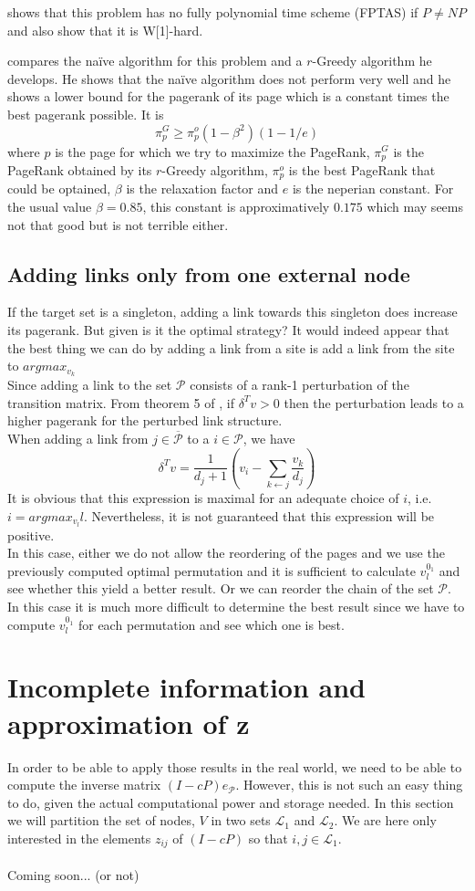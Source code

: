\documentclass{article}
\newcommand{\1}{\mathbf{1}}
\theoremstyle{definition}
\begin{document}
\cite{olsen2010maximizing} shows that this problem has no fully polynomial time scheme (FPTAS) if $P \neq NP$ and also show that it is W[1]-hard.

\cite{olsen2010constant} compares the naïve algorithm for this problem and a $r$-Greedy algorithm he develops.
He shows that the naïve algorithm does not perform very well and he shows a lower bound for the pagerank of its page which is a constant times the best pagerank possible. It is
\[ \pi_p^G \geq \pi_p^o(1 - \beta^2)(1 - 1/e) \]
where $p$ is the page for which we try to maximize the PageRank,
$\pi_p^G$ is the PageRank obtained by its $r$-Greedy algorithm, $\pi_p^o$ is the best PageRank that could be optained, $\beta$ is the relaxation factor and $e$ is the neperian constant.
For the usual value $\beta = 0.85$, this constant is approximatively $0.175$ which may seems not that good but is not terrible either.\\
\subsection{Adding links only from one external node}
If the target set is a singleton, adding a link towards this singleton does increase its pagerank. But given is it the optimal strategy? It would indeed appear that the best thing we can do by adding a link from a site is add a link from the site to $argmax_{v_k}$\\ 
Since adding a link to the set $\mathcal{P}$ consists of a rank-1 perturbation of the transition matrix. From theorem 5 of \cite{de2008maximizing}, if $\delta^Tv>0$ then the perturbation leads to a higher pagerank for the perturbed link structure.\\
When adding a link from $j \in \overline{\mathcal{P}}$ to a $i \in \mathcal{P}$, we have 
$$ \delta^Tv = \frac{1}{d_{j}+1}(v_i-\sum_{k\leftarrow j}\frac{v_k}{d_j})$$
It is obvious that this expression is maximal for an adequate choice of $i$, i.e. $i = argmax_{v_l} l$. Nevertheless, it is not guaranteed that this expression will be positive.\\
In this case, either we do not allow the reordering of the pages and we use the previously computed optimal permutation and it is sufficient to calculate $v^{0_1}_{l}$ and see whether this yield a better result. Or we can reorder the chain of the set $\mathcal{P}$. In this case it is much more difficult to determine the best result since we have to compute $v^{0_1}_{l}$ for each permutation and see which one is best.
\section{Incomplete information and approximation of z}
In order to be able to apply those results in the real world, we need to be able to compute the inverse matrix $(I-cP)e_{\mathcal{P}}$. However, this is not such an easy thing to do, given the actual computational power and storage needed. In this section we will partition the set of nodes, $V$ in two sets $\mathcal{L}_1$ and $\mathcal{L}_2$. We are here only interested in the elements $z_{ij}$ of $(I-cP)$ so that $i,j \in \mathcal{L}_1$. \\
\\
Coming soon... (or not)



\end{document}
